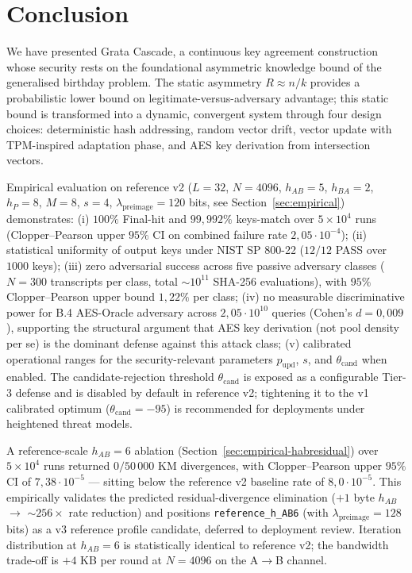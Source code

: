 \documentclass[11pt,a4paper]{article}
\begin{document}
\section{Conclusion}\label{sec:conclusion}

We have presented Grata Cascade, a continuous key agreement construction whose security rests on the foundational asymmetric knowledge bound of the generalised birthday problem. The static asymmetry $R \approx n/k$ provides a probabilistic lower bound on legitimate-versus-adversary advantage; this static bound is transformed into a dynamic, convergent system through four design choices: deterministic hash addressing, random vector drift, vector update with TPM-inspired adaptation phase, and AES key derivation from intersection vectors.

Empirical evaluation on reference v2 ($L = 32$, $N = 4096$, $h_{AB} = 5$, $h_{BA} = 2$, $h_P = 8$, $M = 8$, $s = 4$, $\lambda_\text{preimage} = 120$ bits, see Section~\ref{sec:empirical}) demonstrates: (i) $100\%$ Final-hit and $99{,}992\%$ keys-match over $5 \times 10^4$ runs (Clopper--Pearson upper $95\%$ CI on combined failure rate $2{,}05 \cdot 10^{-4}$); (ii) statistical uniformity of output keys under NIST SP 800-22 ($12/12$ PASS over $1000$ keys); (iii) zero adversarial success across five passive adversary classes ($N = 300$ transcripts per class, total $\sim 10^{11}$ SHA-256 evaluations), with $95\%$ Clopper--Pearson upper bound $1{,}22\%$ per class; (iv) no measurable discriminative power for B.4 AES-Oracle adversary across $2{,}05 \cdot 10^{10}$ queries (Cohen's $d = 0{,}009$), supporting the structural argument that AES key derivation (not pool density per se) is the dominant defense against this attack class; (v) calibrated operational ranges for the security-relevant parameters $p_\text{upd}$, $s$, and $\theta_\text{cand}$ when enabled. The candidate-rejection threshold $\theta_\text{cand}$ is exposed as a configurable Tier-3 defense and is disabled by default in reference v2; tightening it to the v1 calibrated optimum ($\theta_\text{cand} = -95$) is recommended for deployments under heightened threat models.

A reference-scale $h_{AB} = 6$ ablation (Section~\ref{sec:empirical-habresidual}) over $5 \times 10^4$ runs returned $0/50\,000$ KM divergences, with Clopper--Pearson upper $95\%$ CI of $7{,}38 \cdot 10^{-5}$ — sitting below the reference v2 baseline rate of $8{,}0 \cdot 10^{-5}$. This empirically validates the predicted residual-divergence elimination ($+1$ byte $h_{AB}$ $\to$ $\sim 256\times$ rate reduction) and positions \texttt{reference\_h\_AB6} (with $\lambda_\text{preimage} = 128$ bits) as a v3 reference profile candidate, deferred to deployment review. Iteration distribution at $h_{AB} = 6$ is statistically identical to reference v2; the bandwidth trade-off is $+4$ KB per round at $N = 4096$ on the A$\to$B channel.
\end{document}
